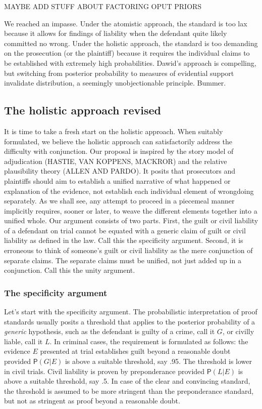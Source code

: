 \documentclass[
  10pt,
  dvipsnames,enabledeprecatedfontcommands]{scrartcl}
\newcommand{\pr}[1]{\mathsf{P}(#1)}
\begin{document}
MAYBE ADD STUFF ABOUT FACTORING OPUT PRIORS

We reached an impasse. Under the atomistic approach, the standard is too
lax because it allows for findings of liability when the defendant quite
likely committed no wrong. Under the holistic approach, the standard is
too demanding on the prosecution (or the plaintiff) because it requires
the individual claims to be established with extremely high
probabilities. Dawid's approach is compelling, but switching from
posterior probability to measures of evidential support invalidate
distribution, a seemingly unobjectionable principle. Bummer.

\hypertarget{the-holistic-approach-revised}{%
\subsection{The holistic approach
revised}\label{the-holistic-approach-revised}}

It is time to take a fresh start on the holistic approach. When suitably
formulated, we believe the holistic approach can satisfactorily address
the difficulty with conjunction. Our proposal is inspired by the story
model of adjudication (HASTIE, VAN KOPPENS, MACKROR) and the relative
plausibility theory (ALLEN AND PARDO). It posits that prosecutors and
plaintiffs should aim to establish a unified narrative of what happened
or explanation of the evidence, not establish each individual element of
wrongdoing separately. As we shall see, any attempt to proceed in a
piecemeal manner implicitly requires, sooner or later, to weave the
different elements together into a unified whole. Our argument consists
of two parts. First, the guilt or civil liability of a defendant on
trial cannot be equated with a generic claim of guilt or civil liability
as defined in the law. Call this the specificity argument. Second, it is
erroneous to think of someone's guilt or civil liability as the mere
conjunction of separate claims. The separate claims must be unified, not
just added up in a conjunction. Call this the unity argument.

\hypertarget{the-specificity-argument}{%
\subsubsection{The specificity
argument}\label{the-specificity-argument}}

Let's start with the specificity argument. The probabilistic
interpretation of proof standards usually posits a threshold that
applies to the posterior probability of a \emph{generic} hypothesis,
such as the defendant is guilty of a crime, call it \(G\), or civilly
liable, call it \(L\). In criminal cases, the requirement is formulated
as follows: the evidence \(E\) presented at trial establishes guilt
beyond a reasonable doubt provided \(\pr{G \vert E}\) is above a
suitable threshold, say .95. The threshold is lower in civil trials.
Civil liability is proven by preponderance provided \(\pr{L \vert E}\)
is above a suitable threshold, say .5. In case of the clear and
convincing standard, the threshold is assumed to be more stringent than
the preponderance standard, but not as stringent as proof beyond a
reasonable doubt.
\end{document}
